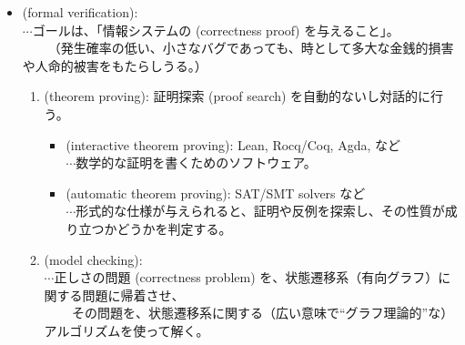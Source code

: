 \documentclass[
		head_space=20mm,
		foot_space=20mm,
		gutter=10mm,
		line_length=190mm
]{jlreq}
\begin{document}
\begin{oframed}
\begin{itemize}
	\item {} (formal verification): \\ $\cdots$ゴールは、「情報システムの (correctness proof) を与えること」。\\~~~~（発生確率の低い、小さなバグであっても、時として多大な金銭的損害や人命的被害をもたらしうる。）\vspace{8pt}
	\begin{enumerate}
		\item {} (theorem proving): 証明探索 (proof search) を自動的ないし対話的に行う。
		\begin{itemize}
			\item {} (interactive theorem proving): Lean, Rocq/Coq, Agda, など \\ $\cdots$数学的な証明を書くためのソフトウェア。
			\item {} (automatic theorem proving): SAT/SMT solvers など \\ $\cdots$形式的な仕様が与えられると、証明や反例を探索し、その性質が成り立つかどうかを判定する。\vspace{8pt}
		\end{itemize}
		\item {} (model checking): \\ $\cdots$正しさの問題 (correctness problem) を、状態遷移系（有向グラフ）に関する問題に帰着させ、 \\~~~~\,その問題を、状態遷移系に関する（広い意味で``グラフ理論的''な）アルゴリズムを使って解く。%
	\end{enumerate}
\end{itemize}
\end{oframed}%
\vspace{18pt}
\end{document}
